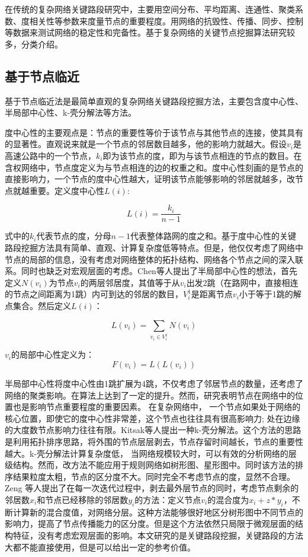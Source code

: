 	在传统的复杂网络关键路段研究中，主要用空间分布、平均距离、连通性、聚类系数、度相关性等参数来度量节点的重要程度。用网络的抗毁性、传播、同步、控制等数据来测试网络的稳定性和完备性。基于复杂网络的关键节点挖掘算法研究较多，分类介绍。
				
	\subsection{基于节点临近}
		基于节点临近法是最简单直观的复杂网络关键路段挖掘方法，主要包含度中心性、半局部中心性、k-壳分解法等方法。

		度中心性的主要观点是：节点的重要性等价于该节点与其他节点的连接，使其具有的显著性。直观说来就是一个节点的邻居数目越多，他的影响力就越大\parencite{Phillip1972Factoring}。假设$v_i$是高速公路中的一个节点，$k_i$即为该节点的度，即为与该节点相连的节点的数目。在含权网络中，节点度定义为与节点相连的边的权重之和。度中心性刻画的是节点的直接影响力，一个节点的度中心性越大，证明该节点能够影响的邻居就越多，改节点就越重要。定义度中心性$L(i)$:

		$$L(i)=\frac{k_i}{n-1}$$

		式中的$k_i$代表节点的度，分母$n-1$代表整体路网的度之和。基于度中心性的关键路段挖掘方法具有简单、直观、计算复杂度低等特点。但是，他仅仅考虑了网络中节点的局部的信息，没有考虑对网络整体的拓扑结构、网络各个节点之间的深入联系。同时也缺乏对宏观层面的考虑。Chen等人提出了半局部中心性的想法\parencite{Chen2012Identifying}，首先定义$N(v_i)$为节点$v_i$的两层邻居度，其值等于从$v_i$出发2跳（在路网中，直接相连的节点之间距离为1跳）内可到达的邻居的数目，$V_i^1$是距离节点$v_i$小于等于1跳的解点集合。然后定义$L(i)$：

		$$L(v_i)=\sum\limits_{v_i \in V_i^1} N(v_i)$$

		$v_i$的局部中心性定义为：
			$$F(v_i)=L(L(v_i))$$

		半局部中心性将度中心性由1跳扩展为4跳，不仅考虑了邻居节点的数量，还考虑了网络的聚类影响。在算法上达到了一定的提升。然而，研究表明节点在网络中的位置也是影响节点重要程度的重要因素。 在复杂网络中， 一个节点如果处于网络的核心位置，即使它的度中心性非常差，这个节点也往往具有很高影响力; 处在边缘的大度数节点影响力往往有限。Kitsak等人提出一种k-壳分解法\parencite{Kitsak2010Identification}。这个方法的思路是利用拓扑排序思路，将外围的节点层层剥去，节点存留时间越长，节点的重要性越大。k-壳分解法计算复杂度低， 当网络规模较大时，可以有效的分析网络的层级结构。然而，改方法不能应用于规则网络如树形图、星形图中。同时该方法的排序结果粒度太粗，节点的区分度不大。同时完全不考虑节点的度，显然不合理。Zeng 等人提出了在每一次迭代过程中，剥去最外层节点的同时，考虑节点剩余的邻居数$x_i$和节点已经移除的邻居数$y_i$的方法\parencite{Zeng2012Ranking}：定义节点$v_i$的混合度为$x_i+z*y_i$，不断计算新的混合度值，对网络分层。这种方法能够很好地区分树形图中不同节点的影响力，提高了节点传播能力的区分度。但是这个方法依然只局限于微观层面的结构特征，没有考虑宏观层面的影响。本文研究的是关键路段挖掘，关键路段的方法大都不能直接使用，但是可以给出一定的参考价值。
			

